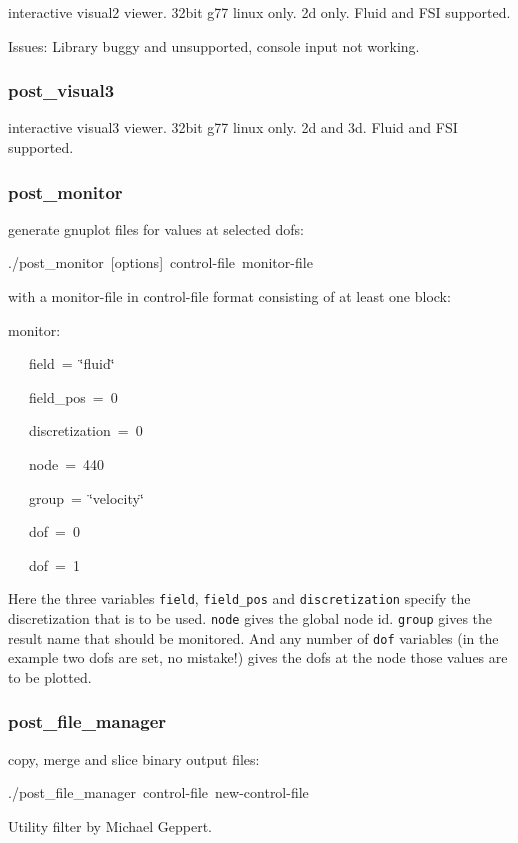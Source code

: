 interactive visual2 viewer. 32bit g77 linux only. 2d only. Fluid and
FSI supported.

Issues: Library buggy and unsupported, console input not working.


\subsubsection{post\_visual3}

interactive visual3 viewer. 32bit g77 linux only. 2d and 3d. Fluid
and FSI supported.


\subsubsection{post\_monitor}

generate gnuplot files for values at selected dofs:

\begin{lyxcode}
./post\_monitor~{[}options]~control-file~monitor-file
\end{lyxcode}
with a monitor-file in control-file format consisting of at least
one block:

\begin{lyxcode}
monitor:

~~~field~=~\char`\"{}fluid\char`\"{}

~~~field\_pos~=~0

~~~discretization~=~0

~~~node~=~440

~~~group~=~\char`\"{}velocity\char`\"{}

~~~dof~=~0

~~~dof~=~1
\end{lyxcode}
Here the three variables \texttt{field}, \texttt{field\_pos} and \texttt{discretization}
specify the discretization that is to be used. \texttt{node} gives
the global node id. \texttt{group} gives the result name that should
be monitored. And any number of \texttt{dof} variables (in the example
two dofs are set, no mistake!) gives the dofs at the node those values
are to be plotted.


\subsubsection{post\_file\_manager}

copy, merge and slice binary output files:

\begin{lyxcode}
./post\_file\_manager~control-file~new-control-file
\end{lyxcode}
Utility filter by Michael Geppert.


